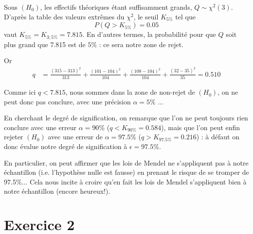 \documentclass[a4paper,oneside,12pt]{article}
\theoremstyle{plain}
\begin{document}
\begin{enumerate}
    Sous $(H_0)$, les effectifs théoriques étant suffisamment grands, $Q \sim \chi^2(3)$. D'après la table des valeurs extrêmes du $\chi^2$, le seuil $K_{5\%}$ tel que $$P(Q>K_{5\%}) = 0.05$$ vaut $K_{5\%}=K_{3;5\%} =7.815$. En d'autres termes, la probabilité pour que $Q$ soit plus grand que 7.815 est de $5\%$ : ce sera notre zone de rejet.

    Or 
    \begin{align*}
        q &= \frac{(315-313)^2}{313}+\frac{(101-104)^2}{104}+\frac{(108-104)^2}{104}+\frac{(32-35)^2}{35} = 0.510
    \end{align*}
    

    Comme ici $q<7.815$, nous sommes dans la zone de non-rejet de $(H_0)$, on ne peut donc pas conclure, avec une précision $\alpha = 5\%$ ...

    En cherchant le degré de signification, on remarque que l'on ne peut toujours rien conclure avec une erreur $\alpha = 90\%$ ($q<K_{90\%} = 0.584$), mais que l'on peut enfin rejeter $(H_{0})$ avec une erreur de $\alpha = 97.5\%$ ($q>K_{97.5\%} = 0.216$) : à défaut on donc évalue notre degré de signification à $\epsilon = 97.5\%$.

    En particulier, on peut affirmer que les lois de Mendel ne s'appliquent pas à notre échantillon (i.e. l'hypothèse nulle est fausse) en prenant le risque de se tromper de 97.5\%... Cela nous incite à croire qu'en fait les lois de Mendel s'appliquent bien à notre échantillon (encore heureux!).

\end{enumerate}

\section*{Exercice 2}
\end{document}
